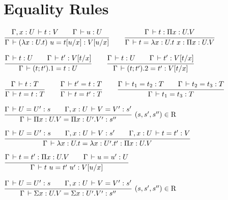 \documentclass[a4paper,english]{lipics-utf8x}
\begin{document}
  \section{Equality Rules}


  \begin{center}
  \(
    \ru{\Gamma, x:U \der t:V \qquad
        \Gamma \der u : U
      }{\Gamma \der (\lambda x:U.t)~u = t[u/x] : V[u/x]}
    \qquad
    \ru{\Gamma \der t : \Pi x:U.V
      }{\Gamma \der t = \lambda x:U.t~x : \Pi x:U.V}
  \)
  \end{center}

  \begin{center}
  \(
    \ru{\Gamma \der t : U \qquad
        \Gamma \der t' : V[t/x]
      }{\Gamma \der (t;t').1 = t : U}
    \qquad
    \ru{\Gamma \der t : U \qquad
        \Gamma \der t' : V[t/x]
      }{\Gamma \der (t;t').2 = t' : V[t/x]}
  \)
  \end{center}


  \begin{center}
  \(
    \ru{\Gamma \der t : T
      }{\Gamma \der t = t : T}
    \qquad
    \ru{\Gamma \der t' = t : T
      }{\Gamma \der t = t' : T}
    \qquad
    \ru{\Gamma \der t_1 = t_2 : T \qquad
        \Gamma \der t_2 = t_3 : T
      }{\Gamma \der t_1 = t_3 : T}
  \)
  \end{center}


  \begin{center}
  \(
    \rux{\Gamma \der U = U' : s \qquad
         \Gamma, x:U \der V = V' : s'
       }{\Gamma \der \Pi x:U.V = \Pi x:U'.V' : s''
       }{(s,s',s'') \in \R}
  \)
  \end{center}

  \begin{center}
  \(
    \ru{\Gamma \der U = U' : s \qquad
        \Gamma, x:U \der V : s' \qquad
        \Gamma, x:U \der t = t' : V
      }{\Gamma \der \lambda x:U.t = \lambda x:U'.t' : \Pi x:U.V}
  \)
  \end{center}

  \begin{center}
  \(
    \ru{\Gamma \der t = t' : \Pi x:U.V \qquad
        \Gamma \der u = u' : U
      }{\Gamma \der t~u = t'~u' : V[u/x]}
  \)
  \end{center}

  \begin{center}
  \(
    \rux{\Gamma \der U = U' : s \qquad
         \Gamma, x:U \der V = V' : s'
       }{\Gamma \der \Sigma x:U.V = \Sigma x:U'.V' : s''
       }{(s,s',s'') \in \R}
  \)
  \end{center}
\end{document}
